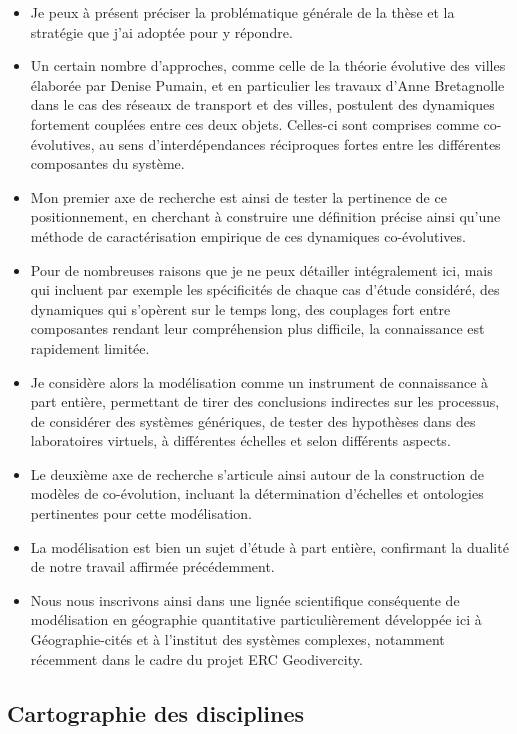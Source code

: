 \documentclass[12pt]{article}
\begin{document}
\begin{itemize}
	\item Je peux à présent préciser la problématique générale de la thèse et la stratégie que j'ai adoptée pour y répondre.
	\item Un certain nombre d'approches, comme celle de la théorie évolutive des villes élaborée par Denise Pumain, et en particulier les travaux d'Anne Bretagnolle dans le cas des réseaux de transport et des villes, postulent des dynamiques fortement couplées entre ces deux objets. Celles-ci sont comprises comme co-évolutives, au sens d'interdépendances réciproques fortes entre les différentes composantes du système.
	\item Mon premier axe de recherche est ainsi de tester la pertinence de ce positionnement, en cherchant à construire une définition précise ainsi qu'une méthode de caractérisation empirique de ces dynamiques co-évolutives.
	\item Pour de nombreuses raisons que je ne peux détailler intégralement ici, mais qui incluent par exemple les spécificités de chaque cas d'étude considéré, des dynamiques qui s'opèrent sur le temps long, des couplages fort entre composantes rendant leur compréhension plus difficile, la connaissance est rapidement limitée.
	\item Je considère alors la modélisation comme un instrument de connaissance à part entière, permettant de tirer des conclusions indirectes sur les processus, de considérer des systèmes génériques, de tester des hypothèses dans des laboratoires virtuels, à différentes échelles et selon différents aspects.
	\item Le deuxième axe de recherche s'articule ainsi autour de la construction de modèles de co-évolution, incluant la détermination d'échelles et ontologies pertinentes pour cette modélisation.
	\item La modélisation est bien un sujet d'étude à part entière, confirmant la dualité de notre travail affirmée précédemment. 
	\item Nous nous inscrivons ainsi dans une lignée scientifique conséquente de modélisation en géographie quantitative particulièrement développée ici à Géographie-cités et à l'institut des systèmes complexes, notamment récemment dans le cadre du projet ERC Geodivercity.
\end{itemize}

\newpage


\subsection*{Cartographie des disciplines}
\end{document}
